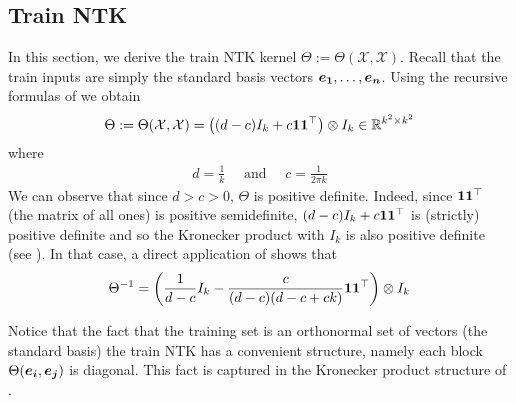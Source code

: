 \subsection{Train NTK}
In this section, we derive the train NTK kernel $\Theta:=\Theta(\mathcal{X}, \mathcal{X})$. Recall that the train inputs are simply the standard basis vectors $\boldsymbol{e_1},\dots, \boldsymbol{e_n}$. Using the recursive formulas of  we obtain
\begin{equation}
\Theta := \Theta(\mathcal{X}, \mathcal{X}) = \left((d-c)I_{k} + c\boldsymbol{1}\boldsymbol{1}^\top\right) \otimes I_{k} \in \mathbb{R}^{k^2 \times k^2}
\label{eq:limit_NTK}
\end{equation}
where 
\begin{align}
\label{eq:c_and_d}
    d = \frac{1}{k} \quad \textrm{ and } \quad
    c = \frac{1}{2\pi k}
\end{align}
We can observe that since $d>c>0$, $\Theta$ is positive definite. Indeed, since $\boldsymbol{1}\boldsymbol{1}^\top$ (the matrix of all ones) is positive semidefinite, $(d-c)I_{k} + c\boldsymbol{1}\boldsymbol{1}^\top$ is (strictly) positive definite and so the Kronecker product with $I_k$ is also positive definite (see ). In that case, a direct application of  shows that 
\begin{equation}
\label{eq:invntk}
    \Theta^{-1} = \left(\frac{1}{d-c} I_k - \frac{c}{(d-c)(d-c+ck)}\boldsymbol{1}\boldsymbol{1}^\top\right) \otimes I_k
\end{equation}

Notice that the fact that the training set is an orthonormal set of vectors (the standard basis) the train NTK has a convenient structure, namely each block $\Theta(\boldsymbol{e_i}, \boldsymbol{e_j})$ is diagonal. This fact is captured in the Kronecker product structure of .

